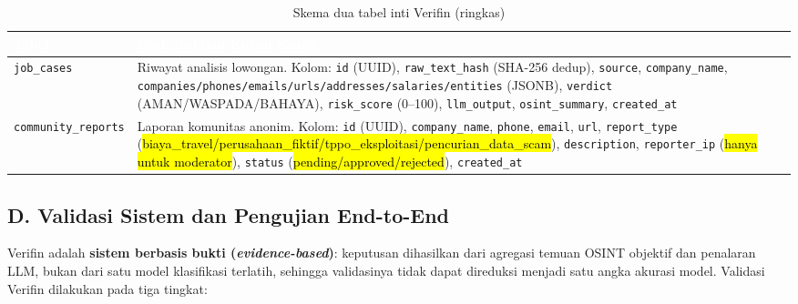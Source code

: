 \documentclass[12pt,a4paper]{article}
\newcommand{\revisi}[1]{\hl{#1}}
\newcommand{\thead}[1]{\textcolor{white}{\textbf{#1}}}
\begin{document}
\begin{table}[H]
\centering
\caption{Skema dua tabel inti Verifin (ringkas)}
\label{tab:ddl-schema}
\small
\begin{tabularx}{\linewidth}{|p{3.5cm}|Y|}
\hline
{}\thead{Tabel} & \thead{Deskripsi dan Kolom Kunci} \\
\hline
{}
\texttt{job\_cases} & Riwayat analisis lowongan. Kolom: \texttt{id} (UUID), \texttt{raw\_text\_hash} (SHA-256 dedup), \texttt{source}, \texttt{company\_name}, \texttt{companies/phones/emails/urls/addresses/salaries/entities} (JSONB), \texttt{verdict} (AMAN/WASPADA/BAHAYA), \texttt{risk\_score} (0--100), \texttt{llm\_output}, \texttt{osint\_summary}, \texttt{created\_at} \\ \hline
\texttt{community\_reports} & Laporan komunitas anonim. Kolom: \texttt{id} (UUID), \texttt{company\_name}, \texttt{phone}, \texttt{email}, \texttt{url}, \texttt{report\_type} (\revisi{biaya\_travel/perusahaan\_fiktif/tppo\_eksploitasi/pencurian\_data\_scam}), \texttt{description}, \texttt{reporter\_ip} (\revisi{hanya untuk moderator}), \texttt{status} (\revisi{pending/approved/rejected}), \texttt{created\_at} \\ \hline
\end{tabularx}
\end{table}

\subsection*{D. Validasi Sistem dan Pengujian End-to-End}

Verifin adalah \textbf{sistem berbasis bukti (\textit{evidence-based})}: keputusan
dihasilkan dari agregasi temuan OSINT objektif dan penalaran LLM, bukan dari satu model
klasifikasi terlatih, sehingga validasinya tidak
dapat direduksi menjadi satu angka akurasi model. Validasi Verifin dilakukan pada tiga tingkat:
\end{document}
